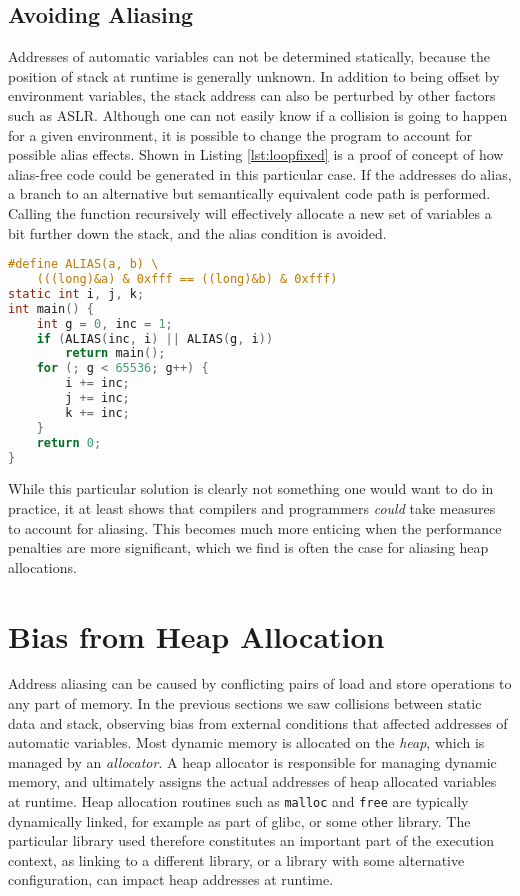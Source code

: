 \documentclass[prodmode,acmtaco]{acmsmall}
\begin{document}
{\subsection{Avoiding Aliasing}
Addresses of automatic variables can not be determined statically, because the position of stack at runtime is generally unknown. 
In addition to being offset by environment variables, the stack address can also be perturbed by other factors such as ASLR. 
Although one can not easily know if a collision is going to happen for a given environment, it is possible to change the program to account for possible alias effects.
Shown in Listing \ref{lst:loopfixed} is a proof of concept of how alias-free code could be generated in this particular case.
If the addresses do alias, a branch to an alternative but semantically equivalent code path is performed.
Calling the function recursively will effectively allocate a new set of variables a bit further down the stack, and the alias condition is avoided.

\begin{lstlisting}[float=b, language=C, caption={Dynamically detect aliasing case, and avoid by pushing another stack frame.}, label={lst:loopfixed}, frame=lines]
#define ALIAS(a, b) \
    (((long)&a) & 0xfff == ((long)&b) & 0xfff)
static int i, j, k;
int main() {
    int g = 0, inc = 1;
    if (ALIAS(inc, i) || ALIAS(g, i))
        return main();
    for (; g < 65536; g++) {
        i += inc;
        j += inc;
        k += inc;
    }
    return 0;
}
\end{lstlisting}

While this particular solution is clearly not something one would want to do in practice, it at least shows that compilers and programmers \emph{could} take measures to account for aliasing.
This becomes much more enticing when the performance penalties are more significant, which we find is often the case for aliasing heap allocations.



\section{Bias from Heap Allocation}
Address aliasing can be caused by conflicting pairs of load and store operations to any part of memory.
In the previous sections we saw collisions between static data and stack, observing bias from external conditions that affected addresses of automatic variables.
Most dynamic memory is allocated on the \emph{heap}, which is managed by an \emph{allocator}.
A heap allocator is responsible for managing dynamic memory, and ultimately assigns the actual addresses of heap allocated variables at runtime.
Heap allocation routines such as \texttt{malloc} and \texttt{free} are typically dynamically linked, for example as part of glibc, or some other library.
The particular library used therefore constitutes an important part of the execution context, as linking to a different library, or a library with some alternative configuration, can impact heap addresses at runtime.


}
\end{document}
